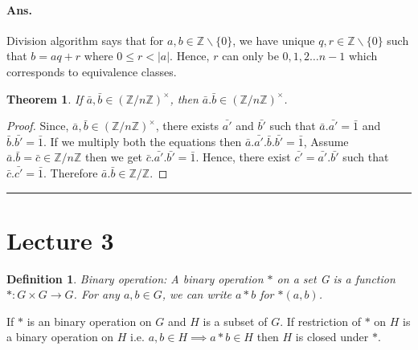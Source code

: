 \documentclass[12pt]{report}
\newtheorem{thm}{Theorem}
\newtheorem{defn}{Definition}
\begin{document}
\paragraph*{Ans. }Division algorithm says that for $a, b \in \mathbb{Z}\backslash\{0\}$, we have unique $q,r \in \mathbb{Z}\backslash \{0\}$ such that $b = aq + r$ where $ 0 \leq r < |a|$. Hence, $r$ can only be $ 0,1,2 \dots n-1$ which corresponds to equivalence classes.
\begin{thm}
    If $\bar{a},\bar{b} \in (\mathbb{Z}/n\mathbb{Z})^{\times}$, then $\bar{a}.\bar{b} \in (\mathbb{Z}/n\mathbb{Z})^{\times}$.
\end{thm}
\begin{proof}
    Since, $\bar{a},\bar{b} \in (\mathbb{Z}/n\mathbb{Z})^{\times}$, there exists $\bar{a'}$ and $\bar{b'}$ such that $\bar{a}.\bar{a'} = \bar{1}$ and $\bar{b}.\bar{b'} = \bar{1}$. If we multiply both the equations then $ \bar{a}.\bar{a'}.\bar{b}.\bar{b'} = \bar{1}$, Assume $\bar{a}.\bar{b} = \bar{c} \in \mathbb{Z}/n\mathbb{Z}$ then we get $\bar{c}.\bar{a'}.\bar{b'} = \bar{1}$. Hence, there exist $\bar{c'} = \bar{a'}.\bar{b'}$ such that $\bar{c}.\bar{c'} = \bar{1}$. Therefore $\bar{a}.\bar{b} \in \mathbb{Z}/\mathbb{Z}$.
\end{proof}
\hrule
\section*{Lecture 3}
\begin{defn}
    Binary operation: A binary operation $*$ on a set G is a function $*:G\times G \to G$. For any $a, b \in G$, we can write $a*b$ for $*(a,b)$. 
\end{defn}
If $*$ is an binary operation on $G$ and $H$ is a subset of $G$. If restriction of $*$ on $H$ is a binary operation on $H$ i.e. $a,b \in H \implies a*b \in H$ then $H$ is closed under $*$.
\end{document}
